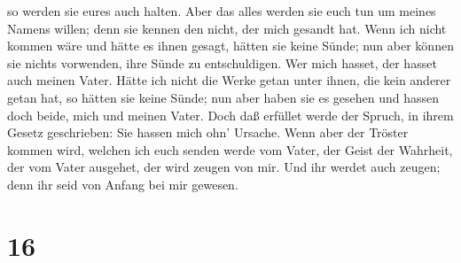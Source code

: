 so werden sie eures auch halten.  Aber das alles werden sie
euch tun um meines Namens willen; denn sie kennen den nicht, der mich
gesandt hat.  Wenn ich nicht kommen wäre und hätte es ihnen
gesagt, hätten sie keine Sünde; nun aber können sie nichts vorwenden,
ihre Sünde zu entschuldigen.  Wer mich hasset, der hasset
auch meinen Vater.  Hätte ich nicht die Werke getan unter
ihnen, die kein anderer getan hat, so hätten sie keine Sünde; nun aber
haben sie es gesehen und hassen doch beide, mich und meinen Vater.
 Doch daß erfüllet werde der Spruch, in ihrem Gesetz
geschrieben: Sie hassen mich ohn' Ursache.  Wenn aber der
Tröster kommen wird, welchen ich euch senden werde vom Vater, der Geist
der Wahrheit, der vom Vater ausgehet, der wird zeugen von mir.
 Und ihr werdet auch zeugen; denn ihr seid von Anfang bei
mir gewesen.

\hypertarget{section-15}{%
\section{16}\label{section-15}}

